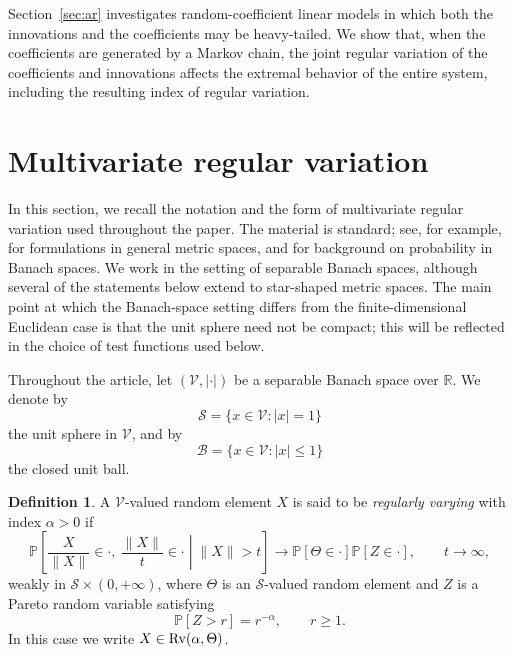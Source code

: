 \documentclass[preprint,12pt]{elsarticle}
\theoremstyle{definition}
\newtheorem{df}[thm]{Definition}
\theoremstyle{remark}
\newcommand{\xbf}{{ x}}
\newcommand{\Xbf}{{ X}}
\newcommand{\1}{{\mathbf 1}}
\numberwithin{equation}{section}
\newcommand{\Pbb}{\mathbb{P}}
\newcommand{\Rvrm}{{\rm Rv}}
\newcommand{\Vcal}{\mathcal{V}}
\newcommand{\Scal}{\mathcal{S}}
\newcommand{\Bcal}{\mathcal{B}}
\begin{document}
  Section~\ref{sec:ar} investigates random-coefficient linear models in which both the innovations and 
  the coefficients may be heavy-tailed. We show that, when the coefficients are generated by a Markov chain, 
  the joint regular variation of the coefficients and innovations affects the extremal behavior of the entire system, 
  including the resulting index of regular variation.

\section{Multivariate regular variation}\label{sec:mrv}

  In this section, we recall the notation and the form of multivariate regular variation used throughout the paper. 
  The material is standard; see, for example, \cite{hult2006regular,segers2017polar} for formulations in general 
  metric spaces, and \cite{ledoux1991probability,araujo1980central} for background on probability in Banach spaces. 
  We work in the setting of separable Banach spaces, although several of the statements below extend to 
  star-shaped metric spaces. The main point at which the Banach-space setting differs from the finite-dimensional 
  Euclidean case is that the unit sphere need not be compact; 
  this will be reflected in the choice of test functions used below.

  Throughout the article, let $(\Vcal,|\cdot|)$ be a separable Banach space over $\mathbb{R}$. We denote by
  \begin{equation*}
    \Scal = \{\xbf \in \Vcal : |\xbf|=1\}
  \end{equation*}
  the unit sphere in $\Vcal$, and by
  \begin{equation*}
    \Bcal = \{\xbf \in \Vcal : |\xbf|\le 1\}
  \end{equation*}
  the closed unit ball.

  \begin{df}\label{def:2:RV1}
    A $\Vcal$-valued random element $\Xbf$ is said to be \textit{regularly varying} with index $\alpha>0$ if
    \begin{equation*}
      \Pbb\left[
      \frac{\Xbf}{\|\Xbf\|} \in \cdot , \:
      \frac{\|\Xbf\|}{t} \in \cdot
      \middle| \|\Xbf\|>t
      \right]
      \to
      \Pbb[\Theta \in \cdot]\Pbb[Z \in \cdot],
      \qquad t\to\infty,
    \end{equation*}
    weakly in $\Scal \times (0,+\infty)$, where $\Theta$ is an $\Scal$-valued random element and $Z$ is a 
    Pareto random variable satisfying
    \begin{equation*}
      \Pbb[Z>r]=r^{-\alpha}, \qquad r\ge 1.
    \end{equation*}
    In this case we write $\Xbf \in \Rvrm(\alpha,\Theta)$.
  \end{df}
\end{document}
